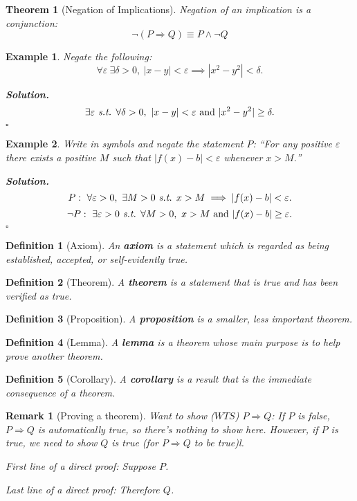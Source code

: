 \documentclass[12pt,a4paper]{article}
\newtheorem{thm}{Theorem}[subsection]
\newtheorem{df}{Definition}[subsection]
\newtheorem{eg}{Example}[subsection]
\newenvironment*{sol}{\par\indent\textbf{\textit{Solution. }}}{\hfill{$\square$}\par}
\newtheorem*{rmk}{\indent Remark}
\def\st{\emph{ s.t. }}
\def\WTS{\mathit{WTS}}
\begin{document}
\begin{thm}[Negation of Implications]
	Negation of an implication is a conjunction:\[\neg(P\Rightarrow Q)\equiv P\wedge\neg Q\]	
\end{thm}
\begin{eg}
	Negate the following: \[\forall\varepsilon\ \exists\delta>0,\ |x-y|<\varepsilon\implies|x^2-y^2|<\delta.\]
	\begin{sol}
		\[\exists\varepsilon\st\forall\delta>0,\ |x-y|<\varepsilon\text{ and }|x^2-y^2|\geq\delta.\]
	\end{sol}
\end{eg}
\begin{eg}
	Write in symbols and negate the statement $P$: ``For any positive $\varepsilon$ there exists a positive $M$ such that $|f(x)-b|<\varepsilon$ whenever $x>M.$''	
	\begin{sol}
		\[P:\ \forall\varepsilon>0,\ \exists M>0\st x>M\implies|f(x)-b|<\varepsilon.\]\[\neg P:\ \exists\varepsilon>0\st\forall M>0,\ x>M\text{ and }|f(x)-b|\geq\varepsilon.\]	
	\end{sol}
\end{eg}
\begin{df}[Axiom]
	An \textbf{axiom} is a statement which is regarded as being established, accepted, or self-evidently true.
\end{df}
\begin{df}[Theorem]
	A \textbf{theorem} is a statement that is true and has been verified as true.	
\end{df}
\begin{df}[Proposition]
	A \textbf{proposition} is a smaller, less important theorem.	
\end{df}
\begin{df}[Lemma]
	A \textbf{lemma} is a theorem whose main purpose is to help prove another theorem.	
\end{df}
\begin{df}[Corollary]
	A \textbf{corollary} is a result that is the immediate consequence of a theorem. 	
\end{df}
\begin{rmk}[Proving a theorem]
	Want to show ($\WTS$) $P\Rightarrow Q$: If	$P$ is false, $P\Rightarrow Q$ is automatically true, so there's nothing to show here. However, if $P$ is true, we need to show $Q$ is true (for $P\Rightarrow Q$ to be true)l.
	
	First line of a direct proof: Suppose $P$.
	
	Last line of a direct proof: Therefore $Q$.
\end{rmk}
\end{document}
